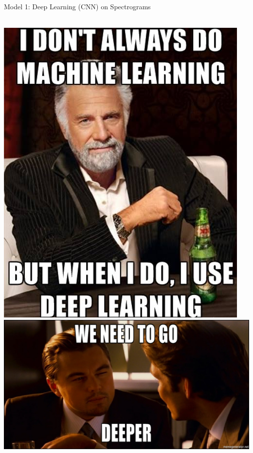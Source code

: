 \documentclass{beamer}
\begin{document}
\begin{frame}{Model 1: Deep Learning (CNN) on Spectrograms}
  \framesubtitle{}
  \begin{columns}
  \includegraphics[scale=0.27]{img/deep.png}
    \includegraphics[scale=0.18]{img/deeper.jpg}
  \end{columns}
\end{frame}
\end{document}
